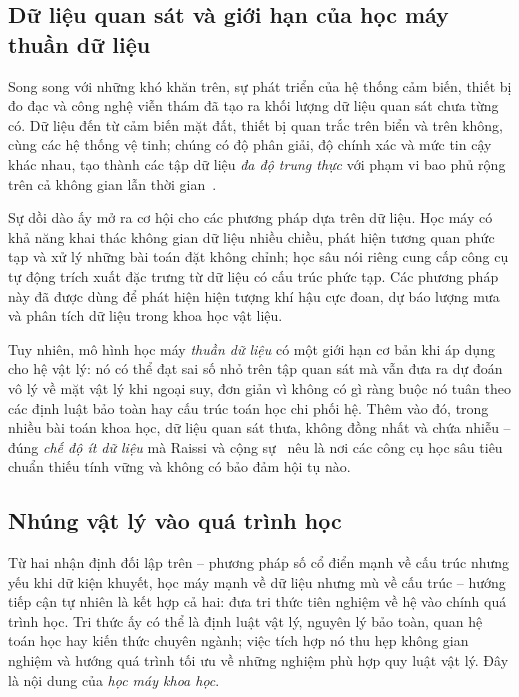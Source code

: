 \subsection{Dữ liệu quan sát và giới hạn của học máy thuần dữ liệu}
 
Song song với những khó khăn trên, sự phát triển của hệ thống cảm biến, thiết bị
đo đạc và công nghệ viễn thám đã tạo ra khối lượng dữ liệu quan sát chưa từng có.
Dữ liệu đến từ cảm biến mặt đất, thiết bị quan trắc trên biển và trên không, cùng
các hệ thống vệ tinh; chúng có độ phân giải, độ chính xác và mức tin cậy khác
nhau, tạo thành các tập dữ liệu \emph{đa độ trung thực} với phạm vi bao phủ rộng
trên cả không gian lẫn thời gian~\cite{karniadakis2021}.
 
Sự dồi dào ấy mở ra cơ hội cho các phương pháp dựa trên dữ liệu. Học máy có khả
năng khai thác không gian dữ liệu nhiều chiều, phát hiện tương quan phức tạp và
xử lý những bài toán đặt không chỉnh; học sâu nói riêng cung cấp công cụ tự động
trích xuất đặc trưng từ dữ liệu có cấu trúc phức tạp. Các phương pháp này đã được
dùng để phát hiện hiện tượng khí hậu cực đoan, dự báo lượng mưa và phân tích dữ
liệu trong khoa học vật liệu.
 
Tuy nhiên, mô hình học máy \emph{thuần dữ liệu} có một giới hạn cơ bản khi áp dụng
cho hệ vật lý: nó có thể đạt sai số nhỏ trên tập quan sát mà vẫn đưa ra dự đoán
vô lý về mặt vật lý khi ngoại suy, đơn giản vì không có gì ràng buộc nó tuân theo
các định luật bảo toàn hay cấu trúc toán học chi phối hệ. Thêm vào đó, trong nhiều
bài toán khoa học, dữ liệu quan sát thưa, không đồng nhất và chứa nhiễu -- đúng
\emph{chế độ ít dữ liệu} mà Raissi và cộng sự~\cite{raissi2019} nêu là nơi các
công cụ học sâu tiêu chuẩn thiếu tính vững và không có bảo đảm hội tụ nào.
 
\subsection{Nhúng vật lý vào quá trình học}
 
Từ hai nhận định đối lập trên -- phương pháp số cổ điển mạnh về cấu trúc nhưng
yếu khi dữ kiện khuyết, học máy mạnh về dữ liệu nhưng mù về cấu trúc -- hướng
tiếp cận tự nhiên là kết hợp cả hai: đưa tri thức tiên nghiệm về hệ vào chính quá
trình học. Tri thức ấy có thể là định luật vật lý, nguyên lý bảo toàn, quan hệ
toán học hay kiến thức chuyên ngành; việc tích hợp nó thu hẹp không gian nghiệm
và hướng quá trình tối ưu về những nghiệm phù hợp quy luật vật lý. Đây là nội
dung của \emph{học máy khoa học}.
 
